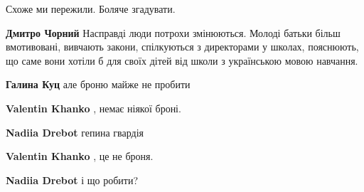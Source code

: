 \begin{itemize}
\begin{itemize}
Схоже ми пережили. Боляче згадувати.

 
\textbf{Дмитро Чорний} Насправді люди потрохи змінюються. Молоді батьки більш вмотивовані, вивчають закони, спілкуються з директорами у школах, пояснюють, що саме вони хотіли б для своїх дітей від школи з українською мовою навчання.

 
\textbf{Галина Куц} але броню майже не пробити

 
\textbf{Valentin Khanko} , немає ніякої броні.

 
\textbf{Nadiia Drebot} гепина гвардія

 
\textbf{Valentin Khanko} , це не броня.

 
\textbf{Nadiia Drebot} і що робити?

 

\end{itemize}
\end{itemize}
